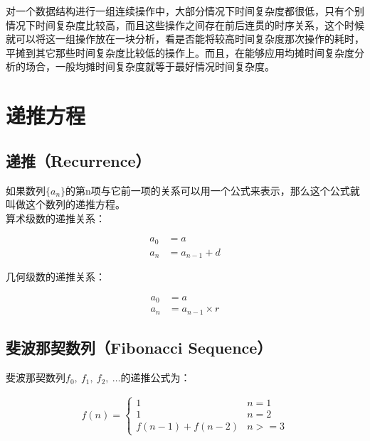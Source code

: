 对一个数据结构进行一组连续操作中，大部分情况下时间复杂度都很低，只有个别情况下时间复杂度比较高，而且这些操作之间存在前后连贯的时序关系，这个时候就可以将这一组操作放在一块分析，看是否能将较高时间复杂度那次操作的耗时，平摊到其它那些时间复杂度比较低的操作上。而且，在能够应用均摊时间复杂度分析的场合，一般均摊时间复杂度就等于最好情况时间复杂度。

\newpage

\section{递推方程}

\subsection{递推（Recurrence）}

如果数列$ \{a_n\} $的第n项与它前一项的关系可以用一个公式来表示，那么这个公式就叫做这个数列的递推方程。 \\

算术级数的递推关系：

\vspace{-1cm}

\begin{align*}
    a_0 & = a           \\
    a_n & = a_{n-1} + d
\end{align*}

几何级数的递推关系：

\vspace{-1cm}

\begin{align*}
    a_0 & = a                \\
    a_n & = a_{n-1} \times r
\end{align*}

\subsection{斐波那契数列（Fibonacci Sequence）}

斐波那契数列$ f_0,\ f_1,\ f_2,\ \dots $的递推公式为：

\begin{align*}
    f(n) = \begin{cases}
        1               & n = 1  \\
        1               & n = 2  \\
        f(n-1) + f(n-2) & n >= 3
    \end{cases}
\end{align*}

